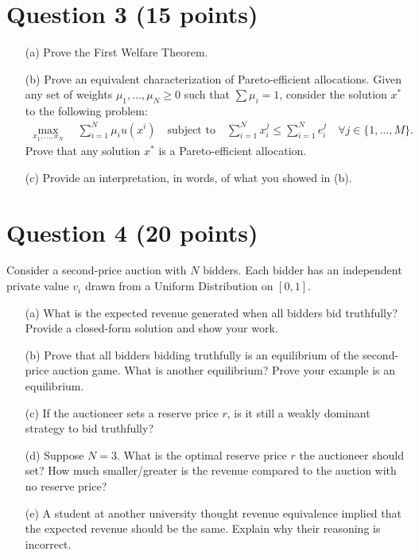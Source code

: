 \documentclass[10pt,a4paper]{article}
\begin{document}
\section*{Question 3 (15 points)}
\begin{enumerate}
    \item[(a)] Prove the First Welfare Theorem.
    \item[(b)] Prove an equivalent characterization of Pareto-efficient allocations. Given any set of weights $\mu_1, \dots, \mu_N \geq 0$ such that $\sum \mu_i = 1$, consider the solution $x^*$ to the following problem:
    \begin{align*}
        \max_{x_1, \dots, x_N} \quad \sum_{i=1}^N \mu_i u(x^i) \quad \text{subject to} \quad \sum_{i=1}^N x_i^j \leq \sum_{i=1}^N e_i^j \quad \forall j \in \{1, \dots, M\}.
    \end{align*}
    Prove that any solution $x^*$ is a Pareto-efficient allocation.
    \item[(c)] Provide an interpretation, in words, of what you showed in (b).
\end{enumerate}

\section*{Question 4 (20 points)}
Consider a second-price auction with $N$ bidders. Each bidder has an independent private value $v_i$ drawn from a Uniform Distribution on $[0, 1]$.
\begin{enumerate}
    \item[(a)] What is the expected revenue generated when all bidders bid truthfully? Provide a closed-form solution and show your work.
    \item[(b)] Prove that all bidders bidding truthfully is an equilibrium of the second-price auction game. What is another equilibrium? Prove your example is an equilibrium.
    \item[(c)] If the auctioneer sets a reserve price $r$, is it still a weakly dominant strategy to bid truthfully?
    \item[(d)] Suppose $N = 3$. What is the optimal reserve price $r$ the auctioneer should set? How much smaller/greater is the revenue compared to the auction with no reserve price?
    \item[(e)] A student at another university thought revenue equivalence implied that the expected revenue should be the same. Explain why their reasoning is incorrect.
\end{enumerate}
\end{document}
